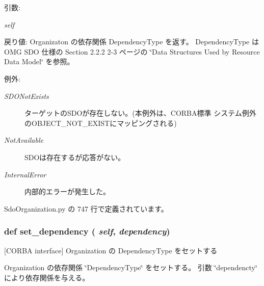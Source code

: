 \begin{Desc}
\item[引数:]
\begin{description}
\item[{\em self}]\end{description}
\end{Desc}
\begin{Desc}
\item[戻り値:]Organizaton の依存関係 DependencyType を返す。 DependencyType は OMG SDO 仕様の Section 2.2.2 2-3 ページの \char`\"{}Data Structures Used by Resource Data Model\char`\"{} を参照。\end{Desc}
\begin{Desc}
\item[例外:]
\begin{description}
\item[{\em SDONotExists}]ターゲットのSDOが存在しない。(本例外は、CORBA標準 システム例外のOBJECT\_\-NOT\_\-EXISTにマッピングされる) \item[{\em NotAvailable}]SDOは存在するが応答がない。 \item[{\em InternalError}]内部的エラーが発生した。 \end{description}
\end{Desc}


 SdoOrganization.py の 747 行で定義されています。
\subsubsection{\setlength{\rightskip}{0pt plus 5cm}def set\_\-dependency ( {\em self},  {\em dependency})}\label{classsource__py_1_1_sdo_organization_1_1_organization__impl_801373cfe9a382d19bdf9d2ef36a5549}


[CORBA interface] Organization の DependencyType をセットする 

Organization の依存関係 \char`\"{}DependencyType\char`\"{} をセットする。 引数 \char`\"{}dependencty\char`\"{} により依存関係を与える。

